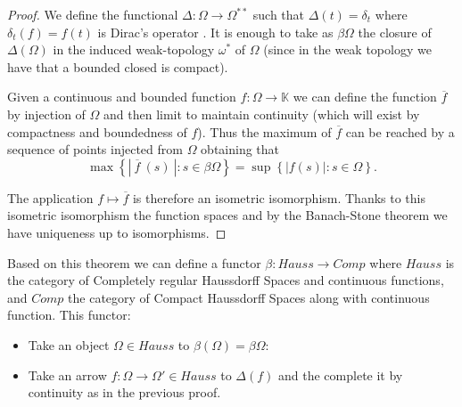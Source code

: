 \begin{example}
\begin{itemize}
    \begin{proof}
      We define the functional $\Delta: \Omega \to \Omega^{**}$   such that $\Delta(t)=\delta_t$ where $\delta_t(f) = f(t)$ is Dirac's operator .  It is enough to take as $\beta \Omega$ the closure of $\Delta(\Omega)$ in the induced weak-topology $\omega^*$ of $\Omega$ (since in the weak topology we have that a bounded closed is compact).  
      
      Given a continuous and bounded function $f:\Omega \to\mathbb K$ we can define the function $\overline{f}$ by injection of $\Omega$ and then limit to maintain continuity (which will exist by compactness and boundedness of $f$). Thus the maximum of $\overline{f}$ can be reached by a sequence of points injected from  $\Omega$ obtaining that   
      $${\displaystyle\max\left\{|\ \overline{f}\ (s)\ | : s \in \beta\Omega\right\} = \sup\left\{| f(s) |: s \in \Omega\right\}}.$$
      
      The application $f \mapsto \overline{f}$ is therefore an isometric isomorphism. Thanks to this isometric isomorphism the function spaces and by the Banach-Stone theorem\cite[Theorem 3]{banach1932theorie} we have uniqueness up to isomorphisms. 
    \end{proof}

    Based on this theorem we can define a functor  $\beta:Hauss \to Comp$ where $Hauss$ is the category of Completely regular Haussdorff  Spaces and continuous functions, and $Comp$ the category of Compact Haussdorff Spaces along with continuous function. This functor:
    \begin{itemize}
    \item Take an object $\Omega \in Hauss$ to $\beta(\Omega) = \beta\Omega$:
    \item Take an arrow $f:\Omega \to \Omega'\in Hauss$ to $\Delta(f)$ and the complete it by continuity as in the previous proof.
    \end{itemize}
    




\end{itemize}
\end{example}
